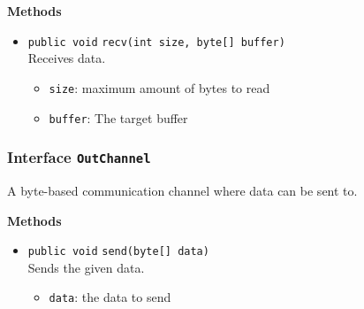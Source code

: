 \textbf{Methods}
\begin{itemize}
\item \lstinline|public void| \lstinline|recv|\lstinline|(int size, byte[] buffer)|\\
Receives data.
\begin{itemize}
\item \lstinline|size|: maximum amount of bytes to read
\item \lstinline|buffer|: The target buffer
\end{itemize}



\end{itemize}

\subsubsection{Interface \lstinline|OutChannel|}
A byte-based communication channel where data can be sent to. \\






\textbf{Methods}
\begin{itemize}
\item \lstinline|public void| \lstinline|send|\lstinline|(byte[] data)|\\
Sends the given data.
\begin{itemize}
\item \lstinline|data|: the data to send
\end{itemize}



\end{itemize}


